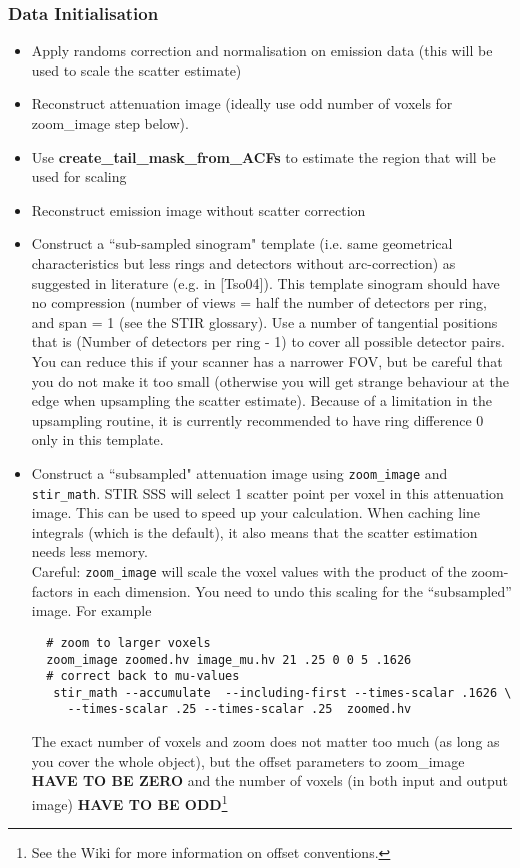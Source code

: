 \documentclass{article}
\begin{document}
\subsubsection{Data Initialisation \label{sec:scatter_data_initialisation}}
\begin{itemize}
\item Apply randoms correction and normalisation on emission data (this will be used to scale the scatter estimate)
\item Reconstruct attenuation image (ideally use odd number of voxels for zoom\_image step below).
\item Use \textbf{create\_tail\_mask\_from\_ACFs} to estimate the region that will be used for scaling
\item Reconstruct emission image without scatter correction
\item Construct a ``sub-sampled sinogram" template (i.e. same geometrical characteristics but
less rings and detectors without arc-correction) as suggested in literature (e.g. in [Tso04]). This template
sinogram should have no compression (number of views = half the number of detectors per ring, and span = 1 (see the
STIR glossary). 
Use a number of tangential positions that is (Number of detectors per ring - 1) to cover all possible
detector pairs. You can reduce this if your scanner has a narrower FOV, but be careful that you do not 
make it too small (otherwise you will get strange behaviour at the edge when upsampling the scatter estimate).
Because of a limitation in the upsampling routine, it is currently recommended to have ring difference 0 only in this
template.
\item Construct a ``subsampled" attenuation image using \texttt{zoom\_image} and \texttt{stir\_math}. 
 STIR SSS will select 1 scatter point per voxel in this attenuation image. This can be used to speed up your
 calculation. When caching line integrals (which is the default), it also means that the scatter estimation
 needs less memory.\\
 Careful: \texttt{zoom\_image} will scale the voxel values with the product of the zoom-factors in each dimension. 
 You need to undo this scaling for the ``subsampled'' image.    
 For example
 \begin{verbatim}
  # zoom to larger voxels 
  zoom_image zoomed.hv image_mu.hv 21 .25 0 0 5 .1626
  # correct back to mu-values
   stir_math --accumulate  --including-first --times-scalar .1626 \
     --times-scalar .25 --times-scalar .25  zoomed.hv
 \end{verbatim}
  The exact number of voxels and zoom does not matter too much (as long as you cover the 
  whole object), but the offset parameters to zoom\_image
  \textbf{HAVE TO BE ZERO} and the number of voxels (in both input and output image)
  \textbf{HAVE TO BE ODD}\footnote{See the Wiki for more information on offset conventions.}
\end{itemize}
\end{document}
